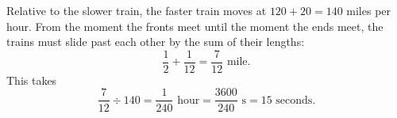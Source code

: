 Relative to the slower train, the faster train moves at $120+20=140$ miles per hour. From the moment the fronts meet until the moment the ends meet, the trains must slide past each other by the sum of their lengths:
\[
\dfrac{1}{2}+\dfrac{1}{12}=\dfrac{7}{12}\text{ mile}.
\]
This takes
\[
\dfrac{7}{12}\div140=\dfrac{1}{240}\text{ hour}=\dfrac{3600}{240}\text{ s}=\boxed{15}\text{ seconds}.
\]
